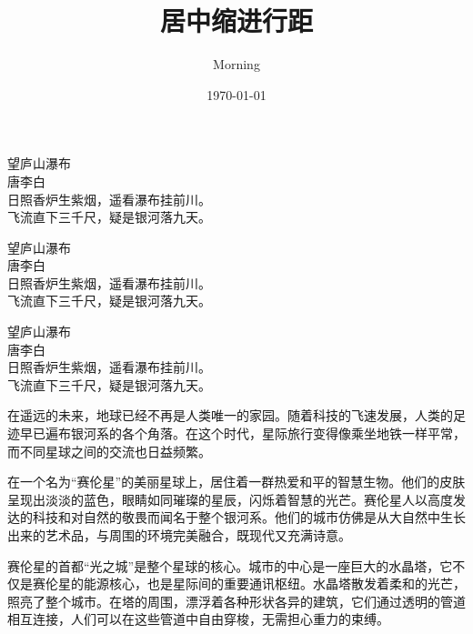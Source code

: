 \documentclass{article}
\title{居中缩进行距}
\author{Morning}
\date{\today}
\begin{document}
\maketitle

\begin{center}
望庐山瀑布\\
唐\hspace{1em}李白\\
日照香炉生紫烟，遥看瀑布挂前川。\\
飞流直下三千尺，疑是银河落九天。
\end{center}

\vspace{1.5em}

\begin{flushleft}
望庐山瀑布\\
唐\hspace{1em}李白\\
日照香炉生紫烟，遥看瀑布挂前川。\\
飞流直下三千尺，疑是银河落九天。
\end{flushleft}

\vspace{1.5em}

\begin{flushright}
望庐山瀑布\\
唐\hspace{1em}李白\\
日照香炉生紫烟，遥看瀑布挂前川。\\
飞流直下三千尺，疑是银河落九天。
\end{flushright}

在遥远的未来，地球已经不再是人类唯一的家园。随着科技的飞速发展，人类的足迹早已遍布银河系的各个角落。在这个时代，星际旅行变得像乘坐地铁一样平常，而不同星球之间的交流也日益频繁。

在一个名为“赛伦星”的美丽星球上，居住着一群热爱和平的智慧生物。他们的皮肤呈现出淡淡的蓝色，眼睛如同璀璨的星辰，闪烁着智慧的光芒。赛伦星人以高度发达的科技和对自然的敬畏而闻名于整个银河系。他们的城市仿佛是从大自然中生长出来的艺术品，与周围的环境完美融合，既现代又充满诗意。

{\linespread{2}\selectfont
赛伦星的首都“光之城”是整个星球的核心。城市的中心是一座巨大的水晶塔，它不仅是赛伦星的能源核心，也是星际间的重要通讯枢纽。水晶塔散发着柔和的光芒，照亮了整个城市。在塔的周围，漂浮着各种形状各异的建筑，它们通过透明的管道相互连接，人们可以在这些管道中自由穿梭，无需担心重力的束缚。\par}%
\end{document}
